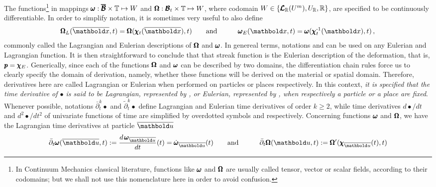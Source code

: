 The functions\footnote{In Continuum Mechanics classical literature, functions like $\pmb{\omega}$ and $\pmb{\Omega}$ are usually called tensor, vector or scalar fields, according to their codomains; but we shall not use this nomenclature here in order to avoid confusion.} in  mappings $\pmb{\omega} : \pmb{\overline{\mathcal{B}}}\times\mathbb{T} \mapsto W$ and $\pmb{\Omega} : \pmb{\mathcal{B}}_t\times\mathbb{T} \mapsto W$, where codomain $W\in\{\pmb{\mathcal{L}}_{\mathbb{R}}(U^m),U_{\mathbb{R}},\mathbb{R}\}$, are specified to be continuously differentiable. In order to simplify notation, it is sometimes very useful to also define  
\begin{alignat}{3}\label{eq:LagEulDesc} 
\tnr{\Omega}_L(\overline{\vto{x}},t)=\tnr{\Omega}(\fua{\tnr{\chi}_t}{\overline{\vto{x}}},t)&\qquad \text{and}\qquad & \tnr{\omega}_E(\vto{x},t)=\tnr{\omega}(\fua{\tnr{\chi}_t^\text{-1}}{{\vto{x}}},t)\,,
\end{alignat}
commonly called the Lagrangian and Eulerian descriptions of $\pmb{\Omega}$ and $\pmb{\omega}$. In genereal terms, notations  and  can be used on any Eulerian and Lagrangian function. It is then straightforward to conclude that that streak function  is the Eulerian description of the deformation, that is, $\pmb{p}=\pmb{\chi}_E$. Generically, since each of the functions $\pmb{\Omega}$ and $\pmb{\omega}$ can be described by two domains, the differentiation chain rules force us to clearly specify the domain of derivation, namely, whether these functions will be derived on the material or spatial domain. Therefore, derivatives here are called Lagrangian or Eulerian when performed on particles or places respectively. In this context, \emph{it is specified that the time derivative of $\bullet$ is said to be Lagrangian, represented by , or Eulerian, represented by , when respectively a particle or a place are fixed}. Whenever possible, notations ${\bar{\partial}}_t^k\bullet$ and ${\tilde{\partial}}_t^k\bullet$ define Lagrangian and Eulerian time derivatives of order $k\geqslant 2$, while time derivatives $d\bullet/dt$ and $d^2\bullet/dt^2$ of univariate functions of time are simplified by overdotted symbols  and  respectively. Concerning functions $\pmb{\omega}$ and $\pmb{\Omega}$, we have the Lagrangian time derivatives at particle $\overline{\vto{u}}$
\begin{alignat}{3}\label{eq:LagDesc} 
\bar{\partial}_t\tnr{\omega}(\overline{\vto{u}},t):=\dfrac{d\,\tnr{\omega}_{\overline{\vto{u}}}}{dt}(t)={\dot{\tnr{\omega}}}_{\overline{\vto{u}}}(t)&\qquad \text{and}\qquad & \bar{\partial}_t\tnr{\Omega}(\vto{u},t):=\tnr{\Omega}'(\fua{\tnr{\chi}_{\overline{\vto{u}}}}{t},t)
\end{alignat}
